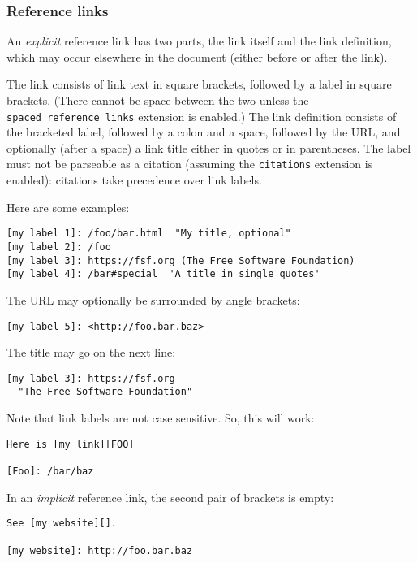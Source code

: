 \documentclass[
]{article}
\begin{document}
\subsubsection{Reference links}\label{reference-links}

An \emph{explicit} reference link has two parts, the link itself and the
link definition, which may occur elsewhere in the document (either
before or after the link).

The link consists of link text in square brackets, followed by a label
in square brackets. (There cannot be space between the two unless the
\texttt{spaced\_reference\_links} extension is enabled.) The link
definition consists of the bracketed label, followed by a colon and a
space, followed by the URL, and optionally (after a space) a link title
either in quotes or in parentheses. The label must not be parseable as a
citation (assuming the \texttt{citations} extension is enabled):
citations take precedence over link labels.

Here are some examples:

\begin{verbatim}
[my label 1]: /foo/bar.html  "My title, optional"
[my label 2]: /foo
[my label 3]: https://fsf.org (The Free Software Foundation)
[my label 4]: /bar#special  'A title in single quotes'
\end{verbatim}

The URL may optionally be surrounded by angle brackets:

\begin{verbatim}
[my label 5]: <http://foo.bar.baz>
\end{verbatim}

The title may go on the next line:

\begin{verbatim}
[my label 3]: https://fsf.org
  "The Free Software Foundation"
\end{verbatim}

Note that link labels are not case sensitive. So, this will work:

\begin{verbatim}
Here is [my link][FOO]

[Foo]: /bar/baz
\end{verbatim}

In an \emph{implicit} reference link, the second pair of brackets is
empty:

\begin{verbatim}
See [my website][].

[my website]: http://foo.bar.baz
\end{verbatim}
\end{document}
